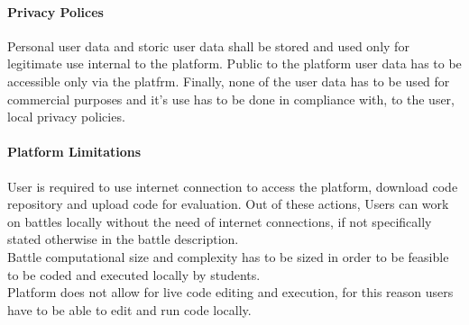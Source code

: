 \paragraph{Privacy Polices}
Personal user data and storic user data shall be stored and used only for legitimate use internal to the platform. Public to the platform user data has to be accessible only via the platfrm. Finally, none of the user data has to be used for commercial purposes and it's use has to be done in compliance with, to the user, local privacy policies. 
\paragraph{Platform Limitations}
User is required to use internet connection to access the platform, download code repository and upload code for evaluation. Out of these actions, Users can work on battles locally without the need of internet connections, if not specifically stated otherwise in the battle description.\\
Battle computational size and complexity has to be sized in order to be feasible to be coded and executed locally by students.\\
Platform does not allow for live code editing and execution, for this reason users have to be able to edit and run code locally.
